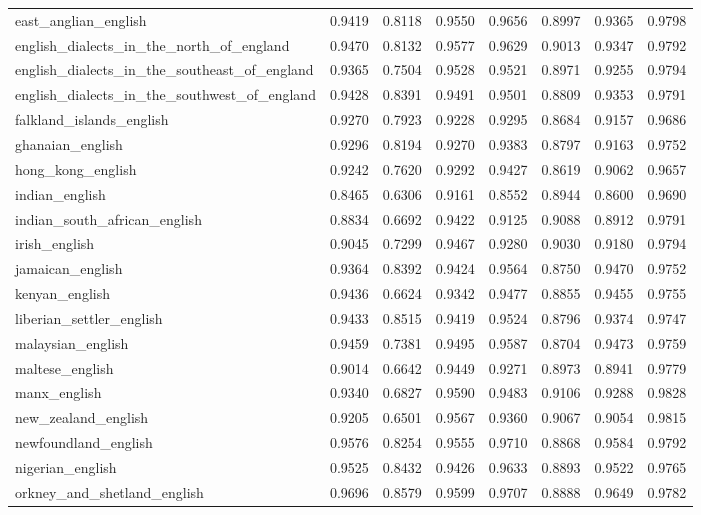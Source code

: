 \begin{landscape}
\begin{longtable}{lccccccc}
east\_anglian\_english & 0.9419 & 0.8118 & 0.9550 & 0.9656 & 0.8997 & 0.9365 & 0.9798 \\
english\_dialects\_in\_the\_north\_of\_england & 0.9470 & 0.8132 & 0.9577 & 0.9629 & 0.9013 & 0.9347 & 0.9792 \\
english\_dialects\_in\_the\_southeast\_of\_england & 0.9365 & 0.7504 & 0.9528 & 0.9521 & 0.8971 & 0.9255 & 0.9794 \\
english\_dialects\_in\_the\_southwest\_of\_england & 0.9428 & 0.8391 & 0.9491 & 0.9501 & 0.8809 & 0.9353 & 0.9791 \\
falkland\_islands\_english & 0.9270 & 0.7923 & 0.9228 & 0.9295 & 0.8684 & 0.9157 & 0.9686 \\
ghanaian\_english & 0.9296 & 0.8194 & 0.9270 & 0.9383 & 0.8797 & 0.9163 & 0.9752 \\
hong\_kong\_english & 0.9242 & 0.7620 & 0.9292 & 0.9427 & 0.8619 & 0.9062 & 0.9657 \\
indian\_english & 0.8465 & 0.6306 & 0.9161 & 0.8552 & 0.8944 & 0.8600 & 0.9690 \\
indian\_south\_african\_english & 0.8834 & 0.6692 & 0.9422 & 0.9125 & 0.9088 & 0.8912 & 0.9791 \\
irish\_english & 0.9045 & 0.7299 & 0.9467 & 0.9280 & 0.9030 & 0.9180 & 0.9794 \\
jamaican\_english & 0.9364 & 0.8392 & 0.9424 & 0.9564 & 0.8750 & 0.9470 & 0.9752 \\
kenyan\_english & 0.9436 & 0.6624 & 0.9342 & 0.9477 & 0.8855 & 0.9455 & 0.9755 \\
liberian\_settler\_english & 0.9433 & 0.8515 & 0.9419 & 0.9524 & 0.8796 & 0.9374 & 0.9747 \\
malaysian\_english & 0.9459 & 0.7381 & 0.9495 & 0.9587 & 0.8704 & 0.9473 & 0.9759 \\
maltese\_english & 0.9014 & 0.6642 & 0.9449 & 0.9271 & 0.8973 & 0.8941 & 0.9779 \\
manx\_english & 0.9340 & 0.6827 & 0.9590 & 0.9483 & 0.9106 & 0.9288 & 0.9828 \\
new\_zealand\_english & 0.9205 & 0.6501 & 0.9567 & 0.9360 & 0.9067 & 0.9054 & 0.9815 \\
newfoundland\_english & 0.9576 & 0.8254 & 0.9555 & 0.9710 & 0.8868 & 0.9584 & 0.9792 \\
nigerian\_english & 0.9525 & 0.8432 & 0.9426 & 0.9633 & 0.8893 & 0.9522 & 0.9765 \\
orkney\_and\_shetland\_english & 0.9696 & 0.8579 & 0.9599 & 0.9707 & 0.8888 & 0.9649 & 0.9782 \\

\end{longtable}
\end{landscape}
